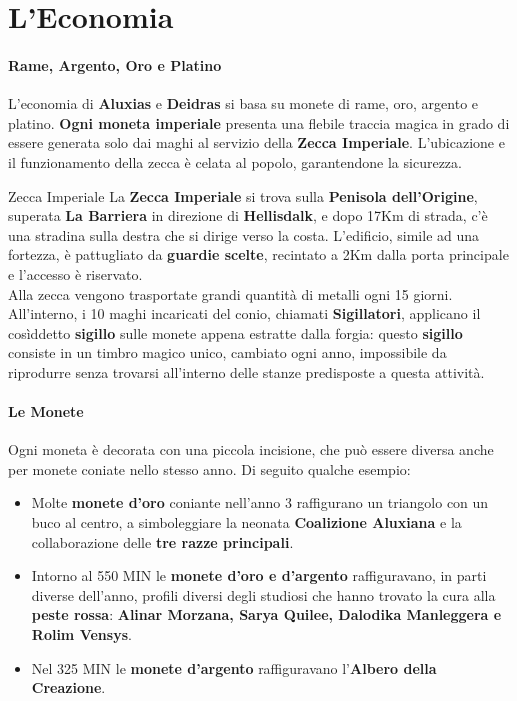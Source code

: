\documentclass[10pt,twoside,onecolumn,openany]{book}
\begin{document}
\section{L'Economia}
\begin{multicols}{2}
\paragraph{Rame, Argento, Oro e Platino}
L'economia di \textbf{Aluxias} e \textbf{Deidras} si basa su monete di rame, oro, argento e platino. \textbf{Ogni moneta imperiale} presenta una flebile traccia magica in grado di essere generata solo dai maghi al servizio della \textbf{Zecca Imperiale}. L'ubicazione e il funzionamento della zecca è celata al popolo, garantendone la sicurezza.\\
\begin{commentbox}{{Zecca Imperiale}}
	La \textbf{Zecca Imperiale} si trova sulla \textbf{Penisola dell'Origine}, superata \textbf{La Barriera} in direzione di \textbf{Hellisdalk}, e dopo 17Km di strada, c'è una stradina sulla destra che si dirige verso la costa. L'edificio, simile ad una fortezza, è pattugliato da \textbf{guardie scelte}, recintato a 2Km dalla porta principale e l'accesso è riservato.\\
	Alla zecca vengono trasportate grandi quantità di metalli ogni 15 giorni. All'interno, i 10 maghi incaricati del conio, chiamati \textbf{Sigillatori}, applicano il cosìddetto \textbf{sigillo} sulle monete appena estratte dalla forgia: questo \textbf{sigillo} consiste in un timbro magico unico, cambiato ogni anno, impossibile da riprodurre senza trovarsi all'interno delle stanze predisposte a questa attività.\\
\end{commentbox}
\paragraph{Le Monete} Ogni moneta è decorata con una piccola incisione, che può essere diversa anche per monete coniate nello stesso anno. Di seguito qualche esempio:
\begin{itemize}
\item Molte \textbf{monete d'oro} coniante nell'anno 3 raffigurano un triangolo con un buco al centro, a simboleggiare la neonata \textbf{Coalizione Aluxiana} e la collaborazione delle \textbf{tre razze principali}.
\item Intorno al 550 MIN le \textbf{monete d'oro e d'argento} raffiguravano, in parti diverse dell'anno, profili diversi degli studiosi che hanno trovato la cura alla \textbf{peste rossa}: \textbf{Alinar Morzana, Sarya Quilee, Dalodika Manleggera e Rolim Vensys}.
\item Nel 325 MIN le \textbf{monete d'argento} raffiguravano l'\textbf{Albero della Creazione}.
\end{itemize}
\end{multicols}
\newpage
\end{document}
